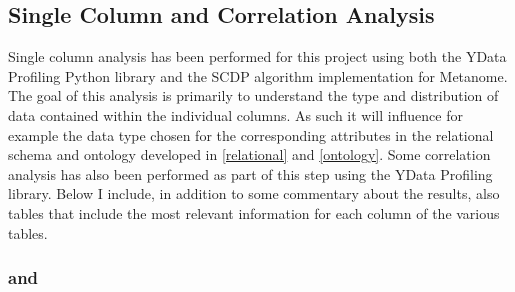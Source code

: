 
\subsection{Single Column and Correlation Analysis} \label{single}

Single column analysis has been performed for this project using both the YData Profiling Python library and the SCDP algorithm implementation for Metanome. The goal of this analysis is primarily to understand the type and distribution of data contained within the individual columns. As such it will influence for example the data type chosen for the corresponding attributes in the relational schema and ontology developed in \cref{relational} and \cref{ontology}. Some correlation analysis has also been performed as part of this step using the YData Profiling library. Below I include, in addition to some commentary about the results, also tables that include the most relevant information for each column of the various tables.


\subsubsection{\texorpdfstring{ and }{bz\_infrastructure\_line and bz\_infrastructure\_node}} \label{single-infra}

